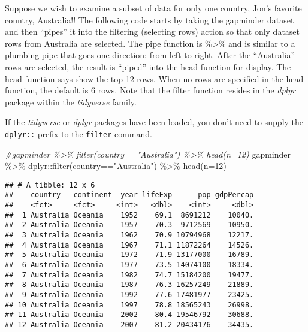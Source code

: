 \documentclass[
]{book}
\newenvironment{Shaded}{\begin{snugshade}}{\end{snugshade}}
\newcommand{\AttributeTok}[1]{\textcolor[rgb]{0.77,0.63,0.00}{#1}}
\newcommand{\CommentTok}[1]{\textcolor[rgb]{0.56,0.35,0.01}{\textit{#1}}}
\newcommand{\DecValTok}[1]{\textcolor[rgb]{0.00,0.00,0.81}{#1}}
\newcommand{\FunctionTok}[1]{\textcolor[rgb]{0.00,0.00,0.00}{#1}}
\newcommand{\NormalTok}[1]{#1}
\newcommand{\SpecialCharTok}[1]{\textcolor[rgb]{0.00,0.00,0.00}{#1}}
\newcommand{\StringTok}[1]{\textcolor[rgb]{0.31,0.60,0.02}{#1}}
\begin{document}
Suppose we wish to examine a subset of data for only one country, Jon's favorite country, Australia!! The following code starts by taking the gapminder dataset and then ``pipes'' it into the filtering (selecting rows) action so that only dataset rows from Australia are selected. The pipe function is \%\textgreater\% and is similar to a plumbing pipe that goes one direction: from left to right. After the ``Australia'' rows are selected, the result is ``piped'' into the head function for display. The head function says show the top 12 rows. When no rows are specified in the head function, the default is 6 rows. Note that the filter function resides in the \emph{dplyr} package within the \emph{tidyverse} family.

If the \emph{tidyverse} or \emph{dplyr} packages have been loaded, you don't need to supply the \texttt{dplyr::} prefix to the \texttt{filter} command.

\begin{Shaded}
\begin{Highlighting}[]
\CommentTok{\#gapminder \%\textgreater{}\% filter(country=="Australia") \%\textgreater{}\% head(n=12)}
\NormalTok{gapminder }\SpecialCharTok{\%\textgreater{}\%}\NormalTok{ dplyr}\SpecialCharTok{::}\FunctionTok{filter}\NormalTok{(country}\SpecialCharTok{==}\StringTok{"Australia"}\NormalTok{) }\SpecialCharTok{\%\textgreater{}\%} \FunctionTok{head}\NormalTok{(}\AttributeTok{n=}\DecValTok{12}\NormalTok{)}
\end{Highlighting}
\end{Shaded}

\begin{verbatim}
## # A tibble: 12 x 6
##    country   continent  year lifeExp      pop gdpPercap
##    <fct>     <fct>     <int>   <dbl>    <int>     <dbl>
##  1 Australia Oceania    1952    69.1  8691212    10040.
##  2 Australia Oceania    1957    70.3  9712569    10950.
##  3 Australia Oceania    1962    70.9 10794968    12217.
##  4 Australia Oceania    1967    71.1 11872264    14526.
##  5 Australia Oceania    1972    71.9 13177000    16789.
##  6 Australia Oceania    1977    73.5 14074100    18334.
##  7 Australia Oceania    1982    74.7 15184200    19477.
##  8 Australia Oceania    1987    76.3 16257249    21889.
##  9 Australia Oceania    1992    77.6 17481977    23425.
## 10 Australia Oceania    1997    78.8 18565243    26998.
## 11 Australia Oceania    2002    80.4 19546792    30688.
## 12 Australia Oceania    2007    81.2 20434176    34435.
\end{verbatim}
\end{document}
